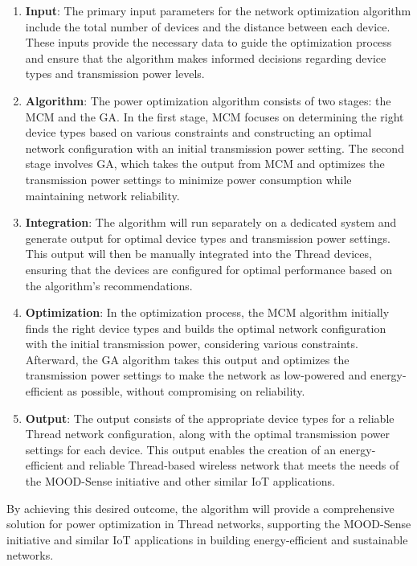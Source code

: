 \begin{enumerate}
    \item \textbf{Input}: The primary input parameters for the network optimization algorithm include the total number of devices and the distance between each device. These inputs provide the necessary data to guide the optimization process and ensure that the algorithm makes informed decisions regarding device types and transmission power levels.
    \item \textbf{Algorithm}: The power optimization algorithm consists of two stages: the \gls{MCM} and the \gls{GA}. In the first stage, \gls{MCM} focuses on determining the right device types based on various constraints and constructing an optimal network configuration with an initial transmission power setting. The second stage involves \gls{GA}, which takes the output from \gls{MCM} and optimizes the transmission power settings to minimize power consumption while maintaining network reliability.
    \item \textbf{Integration}: The algorithm will run separately on a dedicated system and generate output for optimal device types and transmission power settings. This output will then be manually integrated into the Thread devices, ensuring that the devices are configured for optimal performance based on the algorithm's recommendations.
    \item \textbf{Optimization}: In the optimization process, the \gls{MCM} algorithm initially finds the right device types and builds the optimal network configuration with the initial transmission power, considering various constraints. Afterward, the \gls{GA} algorithm takes this output and optimizes the transmission power settings to make the network as low-powered and energy-efficient as possible, without compromising on reliability.
    \item \textbf{Output}: The output consists of the appropriate device types for a reliable Thread network configuration, along with the optimal transmission power settings for each device. This output enables the creation of an energy-efficient and reliable Thread-based wireless network that meets the needs of the MOOD-Sense initiative and other similar \gls{IoT} applications.
\end{enumerate}

By achieving this desired outcome, the algorithm will provide a comprehensive solution for power optimization in Thread networks, supporting the MOOD-Sense initiative and similar IoT applications in building energy-efficient and sustainable networks.


